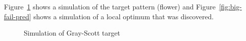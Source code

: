 Figure~\ref{fig:big-fail-true} shows a simulation of the target pattern (flower) and Figure~\ref{fig:big-fail-pred} shows a simulation of a local optimum that was discovered.

\begin{figure}[!h]
            \hfill
            \hfill
            \hfill
            \hfill
            \hfill
            \caption{Simulation of Gray-Scott target}
\label{fig:big-fail-true}
\end{figure}

